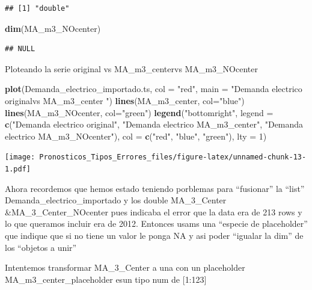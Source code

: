 \documentclass[
]{article}
\newenvironment{Shaded}{\begin{snugshade}}{\end{snugshade}}
\newcommand{\AttributeTok}[1]{\textcolor[rgb]{0.13,0.29,0.53}{#1}}
\newcommand{\DecValTok}[1]{\textcolor[rgb]{0.00,0.00,0.81}{#1}}
\newcommand{\FunctionTok}[1]{\textcolor[rgb]{0.13,0.29,0.53}{\textbf{#1}}}
\newcommand{\NormalTok}[1]{#1}
\newcommand{\StringTok}[1]{\textcolor[rgb]{0.31,0.60,0.02}{#1}}
\begin{document}
\begin{verbatim}
## [1] "double"
\end{verbatim}

\begin{Shaded}
\begin{Highlighting}[]
\FunctionTok{dim}\NormalTok{(MA\_m3\_NOcenter)}
\end{Highlighting}
\end{Shaded}

\begin{verbatim}
## NULL
\end{verbatim}

Ploteando la serie original vs MA\_m3\_centervs MA\_m3\_NOcenter

\begin{Shaded}
\begin{Highlighting}[]
\FunctionTok{plot}\NormalTok{(Demanda\_electrico\_importado.ts, }\AttributeTok{col =} \StringTok{"red"}\NormalTok{, }\AttributeTok{main =} \StringTok{"Demanda electrico \textquotesingle{}original\textquotesingle{}vs MA\_m3\_center "}\NormalTok{)}
\FunctionTok{lines}\NormalTok{(MA\_m3\_center, }\AttributeTok{col=}\StringTok{"blue"}\NormalTok{)}
\FunctionTok{lines}\NormalTok{(MA\_m3\_NOcenter, }\AttributeTok{col=}\StringTok{"green"}\NormalTok{)}
\FunctionTok{legend}\NormalTok{(}\StringTok{"bottomright"}\NormalTok{, }\AttributeTok{legend =} \FunctionTok{c}\NormalTok{(}\StringTok{"Demanda electrico original"}\NormalTok{, }\StringTok{"Demanda electrico MA\_m3\_center"}\NormalTok{, }\StringTok{"Demanda electrico MA\_m3\_NOcenter"}\NormalTok{), }\AttributeTok{col =} \FunctionTok{c}\NormalTok{(}\StringTok{"red"}\NormalTok{, }\StringTok{"blue"}\NormalTok{, }\StringTok{"green"}\NormalTok{), }\AttributeTok{lty =} \DecValTok{1}\NormalTok{)}
\end{Highlighting}
\end{Shaded}

\texttt{[image: Pronosticos\_Tipos\_Errores\_files/figure-latex/unnamed-chunk-13-1.pdf]}

Ahora recordemos que hemos estado teniendo porblemas para ``fusionar''
la ``list'' Demanda\_electrico\_importado y los double MA\_3\_Center
\&MA\_3\_Center\_NOcenter pues indicaba el error que la data era de 213
rows y lo que queramos incluir era de 2012. Entonces usams una ``especie
de placeholder'' que indique que si no tiene un valor le ponga NA y asi
poder ``igualar la dim'' de los ``objetos a unir''

Intentemos transformar MA\_3\_Center a una con un placeholder
MA\_m3\_center\_placeholder esun tipo num de {[}1:123{]}
\end{document}
